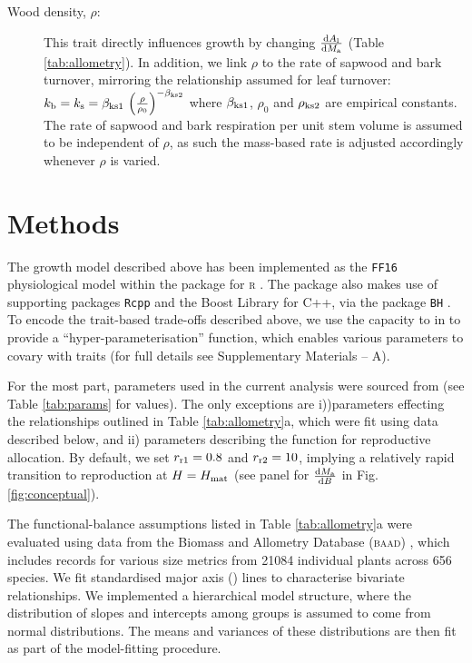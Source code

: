 \documentclass[a4paper,11pt]{article}
\begin{document}
\begin{description}
\item[Wood density, $\rho$:] This trait directly influences growth by changing $\frac{{\rm d}A_{\rm l}}{{\rm d}M_{\rm a}}$ (Table \ref{tab:allometry}). In addition, we link $\rho$ to the rate of sapwood and bark turnover, mirroring the relationship assumed for leaf turnover: $k_{\rm b} = k_{\rm s} = \beta_{{\rm ks1}} \, \left(\frac{\rho}{\rho_0}\right)^{-\beta_{{\rm ks2}}}$ where $\beta_{{\rm ks1}}$, $\rho_0$ and $\rho_{{\rm ks2}}$ are empirical constants. The rate of sapwood and bark respiration per unit stem volume is assumed to be independent of $\rho$, as such the mass-based rate is adjusted accordingly  whenever $\rho$ is varied.
 \end{description}

\section{Methods}

The growth model described above has been implemented as the \texttt{FF16} physiological model within the {\plant} package \citep{Falster-2016} for \textsc{r} \citep{R-2015}. The {\plant} package also makes use of supporting packages \texttt{Rcpp} \citep{Eddelbuettel-2013} and the Boost Library for C++\citep{Schaling-2014}, via the package \texttt{BH} \citep{Eddelbuettel-2015}. To encode the trait-based trade-offs described above, we use the capacity to in {\plant} to provide a ``hyper-parameterisation'' function, which enables various parameters to covary with traits (for full details see Supplementary Materials -- A).

For the most part, parameters used in the current analysis were sourced from \citet{Falster-2016} (see Table \ref{tab:params} for values). The only exceptions are i))parameters effecting the relationships outlined in Table \ref{tab:allometry}a, which were fit using data described below, and ii) parameters describing the function for reproductive allocation. By default, we set $r_{\rm r1}=0.8$ and $r_{\rm r2}=10$, implying a relatively rapid transition to reproduction at $H=H_{{\rm mat}}$ (see panel for $\frac{{\rm d}M_{{\rm a}}}{{\rm d}B}$ in Fig. \ref{fig:conceptual}).

The functional-balance assumptions listed in Table \ref{tab:allometry}a were evaluated using data from the Biomass and Allometry Database (\textsc{baad}) \citep{Falster-2015b}, which includes records for various size metrics from 21084 individual plants across 656 species. We fit standardised major axis ({\sma}) lines \citep{Warton-2006} to characterise bivariate relationships. We implemented a hierarchical model structure, where the distribution of slopes and intercepts among groups is assumed to come from normal distributions. The means and variances of these distributions are then fit as part of the model-fitting procedure.
\end{document}
